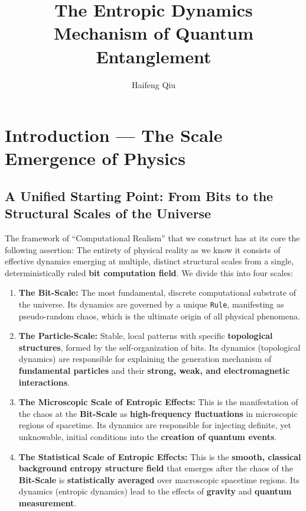 \documentclass[11pt]{article}
\title{\textbf{The Entropic Dynamics Mechanism of Quantum Entanglement}}
\author{Haifeng Qiu}
\begin{document}
\maketitle
\thispagestyle{empty} %
\newpage
\setcounter{page}{1}


\section{Introduction — The Scale Emergence of Physics}

\subsection{A Unified Starting Point: From Bits to the Structural Scales of the Universe}

The framework of ``Computational Realism'' that we construct has at its core the following assertion: The entirety of physical reality as we know it consists of effective dynamics emerging at multiple, distinct structural scales from a single, deterministically ruled \textbf{bit computation field}. We divide this into four scales:

\begin{enumerate}
    \item   \textbf{The Bit-Scale:} The most fundamental, discrete computational substrate of the universe. Its dynamics are governed by a unique \texttt{Rule}, manifesting as pseudo-random chaos, which is the ultimate origin of all physical phenomena.
    
    \item   \textbf{The Particle-Scale:} Stable, local patterns with specific \textbf{topological structures}, formed by the self-organization of bits. Its dynamics (topological dynamics) are responsible for explaining the generation mechanism of \textbf{fundamental particles} and their \textbf{strong, weak, and electromagnetic interactions}.
    
    \item   \textbf{The Microscopic Scale of Entropic Effects:} This is the manifestation of the chaos at the \textbf{Bit-Scale} as \textbf{high-frequency fluctuations} in microscopic regions of spacetime. Its dynamics are responsible for injecting definite, yet unknowable, initial conditions into the \textbf{creation of quantum events}.
    
    \item   \textbf{The Statistical Scale of Entropic Effects:} This is the \textbf{smooth, classical background entropy structure field} that emerges after the chaos of the \textbf{Bit-Scale} is \textbf{statistically averaged} over macroscopic spacetime regions. Its dynamics (entropic dynamics) lead to the effects of \textbf{gravity} and \textbf{quantum measurement}.
\end{enumerate}
\end{document}
